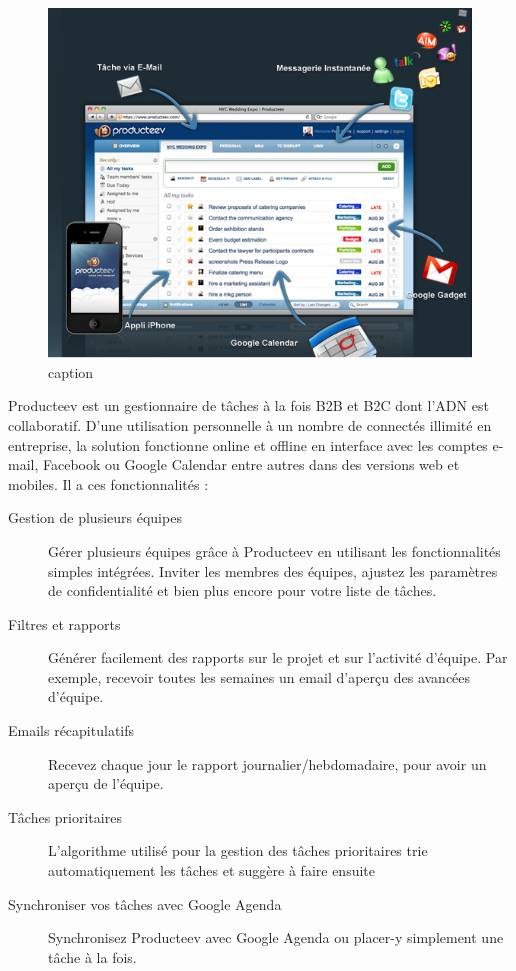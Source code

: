 \begin{figure}[htbp]
	\centering
		\includegraphics[width=6in]{Image/Producteev.png}
	\caption{caption}
	\label{fig:Image_Producteev}
\end{figure}

Producteev est un gestionnaire de tâches à la fois B2B et B2C dont l’ADN est collaboratif. D’une utilisation personnelle à un nombre de connectés illimité en entreprise, la solution fonctionne online et offline en interface avec les comptes e-mail, Facebook ou Google Calendar entre autres dans des versions web et mobiles. Il a ces fonctionnalités :
\begin{description}
	\item[Gestion de plusieurs équipes] Gérer plusieurs équipes grâce à Producteev en utilisant les fonctionnalités simples intégrées. Inviter les membres des équipes, ajustez les paramètres de confidentialité et bien plus encore pour votre liste de tâches.
	\item[Filtres et rapports] Générer facilement des rapports sur le projet et sur l'activité d'équipe. Par exemple, recevoir toutes les semaines un email d'aperçu des avancées d'équipe.
	\item[Emails récapitulatifs] Recevez chaque jour le rapport journalier/hebdomadaire, pour avoir un aperçu de l'équipe.
	\item[Tâches prioritaires]  L'algorithme utilisé pour la gestion des tâches prioritaires trie automatiquement les tâches et  suggère à faire ensuite
	\item[Synchroniser vos tâches avec Google Agenda] Synchronisez Producteev avec Google Agenda ou placer-y simplement une tâche à la fois. 
\end{description}

